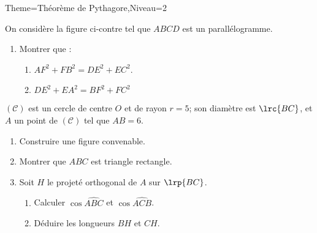 \documentclass[a4paper,12pt]{article}
\begin{document}
\begin{Maquette}[Fiche]{Theme=Théorème de Pythagore,Niveau=2}
\begin{exercice}
\begin{minipage}{0.5\linewidth}
On considère la figure ci-contre tel que $ABCD$ est un parallélogramme.
\begin{enumerate}
\item Montrer que :
\begin{enumerate}
\item $AF^{2}+FB^{2}=DE^{2}+EC^{2}$.
\item $DE^{2}+EA^{2}=BF^{2}+FC^{2}$
\end{enumerate}
\end{enumerate}
\end{minipage}\hfill
\begin{minipage}{0.4\linewidth}
\end{minipage}
\end{exercice}

\begin{exercice}
$(\mathcal{C})$ est un cercle de centre $O$ et de rayon $r=5$; son diamètre  est $\lrc{BC}$, et $A$ un point de $(\mathcal{C})$ tel que $AB=6$.
\begin{enumerate}
\item Construire une figure convenable.
\item Montrer que $ABC$ est triangle rectangle.
\item Soit $H$ le projeté orthogonal de $A$ sur $\lrp{BC}$.
\begin{enumerate}
\item Calculer $\cos\widehat{ABC}$ et $\cos\widehat{ACB}$.
\item Déduire les longueurs $BH$ et $CH$.
\end{enumerate}
\end{enumerate}
\end{exercice}






\end{Maquette}
\end{document}
